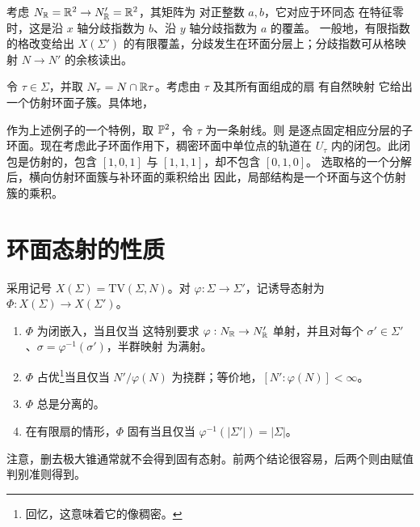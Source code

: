 \begin{example}[格的改变]\label{ex:4.18}
考虑 $N_{\mathbb R}=\mathbb R^2\to N'_{\mathbb R}=\mathbb R^2$，其矩阵为
对正整数 $a,b$，它对应于环同态
在特征零时，这是沿 $x$ 轴分歧指数为 $b$、沿 $y$ 轴分歧指数为 $a$ 的覆盖。
一般地，有限指数的格改变给出 $X(\Sigma')$ 的有限覆盖，分歧发生在环面分层上；分歧指数可从格映射 $N\to N'$ 的余核读出。
\end{example}
\begin{example}\label{ex:4.19}
令 $\tau\in\Sigma$，并取 $N_\tau=N\cap\mathbb R\tau$。考虑由 $\tau$ 及其所有面组成的扇
有自然映射
它给出一个仿射环面子簇。具体地，
\end{example}
\begin{example}\label{ex:4.20}
作为上述例子的一个特例，取 $\mathbb P^2$，令 $\tau$ 为一条射线。则
是逐点固定相应分层的子环面。现在考虑此子环面作用下，稠密环面中单位点的轨道在 $U_\tau$ 内的闭包。此闭包是仿射的，包含 $[1,0,1]$ 与 $[1,1,1]$，却不包含 $[0,1,0]$。
选取格的一个分解后，横向仿射环面簇与补环面的乘积给出
因此，局部结构是一个环面与这个仿射簇的乘积。
\end{example}
\section{环面态射的性质}
采用记号 $X(\Sigma)=\mathrm{TV}(\Sigma,N)$。对 $\varphi:\Sigma\to\Sigma'$，记诱导态射为 $\Phi:X(\Sigma)\to X(\Sigma')$。
\begin{proposition}\label{prop:4.9}
\begin{enumerate}[label=(\alph*)]
\item $\Phi$ 为闭嵌入，当且仅当
这特别要求 $\varphi:N_{\mathbb R}\to N'_{\mathbb R}$ 单射，并且对每个 $\sigma'\in\Sigma'$、$\sigma=\varphi^{-1}(\sigma')$，半群映射
为满射。
\item $\Phi$ 占优\footnote{回忆，这意味着它的像稠密。}当且仅当 $N'/\varphi(N)$ 为挠群；等价地，$[N':\varphi(N)]<\infty$。
\item $\Phi$ 总是分离的。
\item 在有限扇的情形，$\Phi$ 固有当且仅当 $\varphi^{-1}(|\Sigma'|)=|\Sigma|$。
\end{enumerate}
\end{proposition}
注意，删去极大锥通常就不会得到固有态射。前两个结论很容易，后两个则由赋值判别准则得到。
